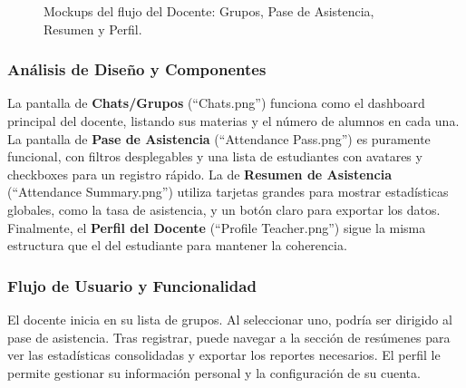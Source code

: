\begin{samepage}
\begin{figure}[H]
	\caption{Mockups del flujo del Docente: Grupos, Pase de Asistencia, Resumen y Perfil.}\label{fig:mk-teacher-flow}
\end{figure}
	\subsubsection*{Análisis de Diseño y Componentes}
	La pantalla de \textbf{Chats/Grupos} (``Chats.png'') funciona como el dashboard principal del docente, listando sus materias y el número de alumnos en cada una. La pantalla de \textbf{Pase de Asistencia} (``Attendance Pass.png'') es puramente funcional, con filtros desplegables y una lista de estudiantes con avatares y checkboxes para un registro rápido. La de \textbf{Resumen de Asistencia} (``Attendance Summary.png'') utiliza tarjetas grandes para mostrar estadísticas globales, como la tasa de asistencia, y un botón claro para exportar los datos. Finalmente, el \textbf{Perfil del Docente} (``Profile Teacher.png'') sigue la misma estructura que el del estudiante para mantener la coherencia.
    
	\subsubsection*{Flujo de Usuario y Funcionalidad}
	El docente inicia en su lista de grupos. Al seleccionar uno, podría ser dirigido al pase de asistencia. Tras registrar, puede navegar a la sección de resúmenes para ver las estadísticas consolidadas y exportar los reportes necesarios. El perfil le permite gestionar su información personal y la configuración de su cuenta.
\normalsize\end{samepage}
\clearpage

